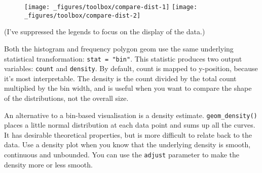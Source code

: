 \begin{figure}[H]
  \texttt{[image: \_figures/toolbox/compare-dist-1]}%
  \texttt{[image: \_figures/toolbox/compare-dist-2]}
\end{figure}

(I've suppressed the legends to focus on the display of the data.)

Both the histogram and frequency polygon geom use the same underlying
statistical transformation: \texttt{stat\ =\ "bin"}. This statistic
produces two output variables: \texttt{count} and \texttt{density}. By
default, count is mapped to y-position, because it's most interpretable.
The density is the count divided by the total count multiplied by the
bin width, and is useful when you want to compare the shape of the
distributions, not the overall size. 

An alternative to a bin-based visualisation is a density estimate.
\texttt{geom\_density()} places a little normal distribution at each
data point and sums up all the curves. It has desirable theoretical
properties, but is more difficult to relate back to the data. Use a
density plot when you know that the underlying density is smooth,
continuous and unbounded. You can use the \texttt{adjust} parameter to
make the density more or less smooth. 

\begin{Shaded}
\begin{Highlighting}[]
\OperatorTok{+}
\StringTok{  }\NormalTok{(} \NormalTok{) }\OperatorTok{+}\StringTok{ }
\StringTok{  }\NormalTok{(}\NormalTok{, }\NormalTok{) }\OperatorTok{+}\StringTok{ }
\StringTok{  }\NormalTok{(} \NormalTok{)}
\OperatorTok{+}
\StringTok{  }\NormalTok{(} \NormalTok{, } \NormalTok{) }\OperatorTok{+}\StringTok{ }
\StringTok{  }\NormalTok{(}\NormalTok{, }\NormalTok{) }\OperatorTok{+}\StringTok{ }
\StringTok{  }\NormalTok{(} \NormalTok{)}
\end{Highlighting}
\end{Shaded}

